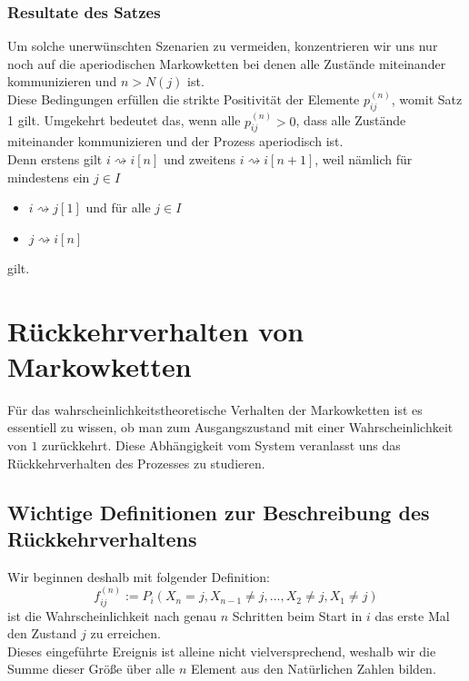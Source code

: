 \documentclass[a4paper]{article}
\begin{document}
\subsubsection{Resultate des Satzes}
Um solche unerwünschten Szenarien zu vermeiden, konzentrieren wir uns nur noch auf die
aperiodischen Markowketten bei denen alle Zustände miteinander kommunizieren und $n > N(j)$ ist.
\\

Diese Bedingungen erfüllen die strikte Positivität der Elemente $p_{ij} ^{(n)}$, womit Satz 1 gilt.
Umgekehrt bedeutet das, wenn alle $p_{ij} ^{(n)} > 0$, dass alle Zustände miteinander kommunizieren und der
Prozess aperiodisch ist.
\\

Denn erstens gilt $i \rightsquigarrow i[n]$ und zweitens $i \rightsquigarrow i[n+1]$,
weil nämlich für mindestens ein $j \in I$

\begin{itemize}
	\item $i \rightsquigarrow j[1]$ und für alle $j \in I$
	\item $j \rightsquigarrow i[n]$
\end{itemize}

gilt.

\section{Rückkehrverhalten von Markowketten}

Für das wahrscheinlichkeitstheoretische Verhalten der Markowketten ist es essentiell zu wissen, ob man
zum Ausgangszustand mit einer Wahrscheinlichkeit von $1$ zurückkehrt. Diese Abhängigkeit vom System
veranlasst uns das Rückkehrverhalten des Prozesses zu studieren.

\subsection{Wichtige Definitionen zur Beschreibung des Rückkehrverhaltens}

Wir beginnen deshalb mit folgender Definition:
\[
f_{ij} ^{(n)} := P_i \left(
	X_n = j, X_{n-1} \ne j, ..., X_2 \ne j, X_1 \ne j
\right) 
\] 
ist die Wahrscheinlichkeit nach genau $n$ Schritten beim Start in $i$ das erste Mal den Zustand $j$ zu erreichen.
\\

Dieses eingeführte Ereignis ist alleine nicht vielversprechend, weshalb wir die Summe dieser Größe über
alle $n$ Element aus den Natürlichen Zahlen bilden.
\end{document}
